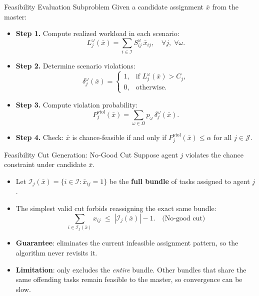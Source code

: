 \documentclass[aspectratio=169,11pt]{beamer}
\begin{document}
\begin{frame}{Feasibility Evaluation Subproblem}
	Given a candidate assignment $\bar{x}$ from the master:
	\begin{itemize}
		\item<1-> \textbf{Step 1.} Compute realized workload in each scenario:
			\[
				L_j^\omega(\bar{x}) = \sum_{i \in \mathcal{I}}
				S_{ij}^\omega\, \bar{x}_{ij},
				\quad \forall j,\; \forall \omega.
			\]
		\item<2-> \textbf{Step 2.} Determine scenario violations:
			\[
				\delta_j^\omega(\bar{x}) =
				\begin{cases}
					1, & \text{if } L_j^\omega(\bar{x}) > C_j,\\
					0, & \text{otherwise.}
				\end{cases}
			\]
		\item<3-> \textbf{Step 3.} Compute violation probability:
			\[
				P_j^{\text{viol}}(\bar{x}) = \sum_{\omega \in \Omega}
				p_\omega\, \delta_j^\omega(\bar{x}).
			\]
		\item<4-> \textbf{Step 4.} Check: $\bar{x}$ is chance-feasible if and only if
			$P_j^{\text{viol}}(\bar{x}) \leq \alpha$ for all $j \in \mathcal{J}$.
	\end{itemize}
\end{frame}

\begin{frame}{Feasibility Cut Generation: No-Good Cut}
	Suppose agent $j$ violates the chance constraint under candidate $\bar{x}$.
	\begin{itemize}
		\item<1-> Let $\mathcal{I}_j(\bar{x}) = \{i \in \mathcal{I} : \bar{x}_{ij} = 1\}$
			be the \textbf{full bundle} of tasks assigned to agent $j$.
		\item<2-> The simplest valid cut forbids reassigning the exact same bundle:
			\[
				\sum_{i \in \mathcal{I}_j(\bar{x})} x_{ij}
				\;\leq\; |\mathcal{I}_j(\bar{x})| - 1.
				\quad \text{(No-good cut)}
			\]
		\item<3-> \textbf{Guarantee}: eliminates the current infeasible assignment
			pattern, so the algorithm never revisits it.
		\item<4-> \textbf{Limitation}: only excludes the \emph{entire} bundle.
			Other bundles that share the same offending tasks remain feasible
			to the master, so convergence can be slow.
	\end{itemize}
\end{frame}
\end{document}
